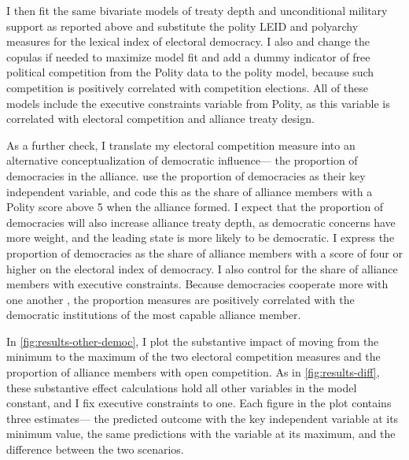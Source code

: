 \documentclass[12pt]{article}
\begin{document}
 
I then fit the same bivariate models of treaty depth and unconditional military support as reported above and substitute the polity LEID and polyarchy measures for the lexical index of electoral democracy.
I also and change the copulas if needed to maximize model fit and add a dummy indicator of free political competition from the Polity data to the polity model, because such competition is positively correlated with competition elections. 
All of these models include the executive constraints variable from Polity, as this variable is correlated with electoral 
competition and alliance treaty design. 


As a further check, I translate my electoral competition measure into an alternative conceptualization of democratic influence--- the proportion of democracies in the alliance.
\citet{Chibaetal2015} use the proportion of democracies as their key independent variable, and code this as the share of alliance members with a Polity score above 5 when the alliance formed. 
I expect that the proportion of democracies will also increase alliance treaty depth, as democratic concerns have more weight, and the leading state is more likely to be democratic. 
I express the proportion of democracies as the share of alliance members with a score of four or higher on the electoral index of democracy. 
I also control for the share of alliance members with executive constraints. 
Because democracies cooperate more with one another \citep{Leeds1999}, the proportion measures are positively correlated with the democratic institutions of the most capable alliance member. 


In \autoref{fig:results-other-democ}, I plot the substantive impact of moving from the minimum to the maximum of the two electoral competition measures and the proportion of alliance members with open competition. 
As in \autoref{fig:results-diff}, these substantive effect calculations hold all other variables in the model constant, and I fix executive constraints to one. 
Each figure in the plot contains three estimates--- the predicted outcome with the key independent variable at its minimum value, the same predictions with the variable at its maximum, and the difference between the two scenarios. 
\end{document}

